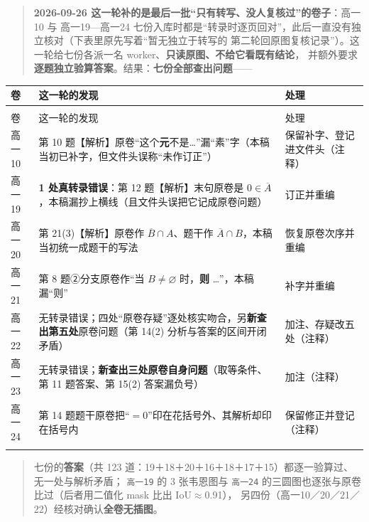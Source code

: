 \documentclass[a4paper,11pt]{article}
\begin{document}
\begin{quote}
\textbf{2026-09-26 这一轮补的是最后一批``只有转写、没人复核过''的卷子}：高一10 与 高一19---高一24
七份入库时都是``转录时逐页回对''，此后一直没有独立核对（下表里原先写着``暂无独立于转写的
第二轮回原图复核记录''）。这一轮给七份各派一名 worker、\textbf{只读原图、不给它看既有结论}，
并额外要求\textbf{逐题独立验算答案}。结果：\textbf{七份全部查出问题}------
\end{quote}

\newcommand{\tabhdrB}{\rowcolor{white} 卷 & 这一轮的发现 & 处理 \\}
\begin{xltabular}{\textwidth}{@{}>{\raggedright\arraybackslash}p{1.91cm}>{\raggedright\arraybackslash}p{7.77cm}>{\centering\arraybackslash}p{5.06cm}@{}}
\toprule
\tabhdrB
\midrule
\endfirsthead
{} \\
\midrule
\tabhdrB
\midrule
\endhead
\bottomrule
\endlastfoot
高一10 & 第 10 题【解析】原卷``这个\textbf{元}不是\ldots''漏``素''字（本稿当初已补字，但文件头误称``未作订正''） & 保留补字、登记进文件头（注释） \\ \addlinespace[1pt]
高一19 & \textbf{1 处真转录错误}：第 12 题【解析】末句原卷是 \(0\in\overline A\)，本稿漏抄上横线（且文件头误把它记成原卷问题） & 订正并重编 \\ \addlinespace[1pt]
高一20 & 第 21(3)【解析】原卷作 \(\overline{B}\cap\allowbreak  A\)、题干作 \(\overline{A}\cap\allowbreak  B\)，本稿当初统一成题干的写法 & 恢复原卷次序并重编 \\ \addlinespace[1pt]
高一21 & 第 8 题②分支原卷作``当 \(B\neq\varnothing\) 时，\textbf{则} \ldots''，本稿漏``则'' & 补字并重编 \\ \addlinespace[1pt]
高一22 & 无转录错误；四处``原卷存疑''逐处核实吻合，另\textbf{新查出第五处}原卷问题（第 14(2) 分析与答案的区间开闭矛盾） & 加注、存疑改五处（注释） \\ \addlinespace[1pt]
高一23 & 无转录错误；\textbf{新查出三处原卷自身问题}（取等条件、第 11 题答案、第 15(2) 答案漏负号） & 加注（注释） \\ \addlinespace[1pt]
高一24 & 第 14 题题干原卷把``\(=\allowbreak 0\)''印在花括号外、其解析却印在括号内 & 保留修正并登记（注释） \\ \addlinespace[1pt]
\end{xltabular}

\begin{quote}
七份的\textbf{答案}（共 123 道：19＋18＋20＋16＋18＋17＋15）都逐一验算过、无一处与解析矛盾；
\texttt{高一19} 的 3 张韦恩图与 \texttt{高一24} 的三圆图也逐张与原卷比过（后者用二值化 mask 比出 IoU$\approx$0.91），
另四份（高一10／20／21／22）经核对确认\textbf{全卷无插图}。
\end{quote}
\end{document}
